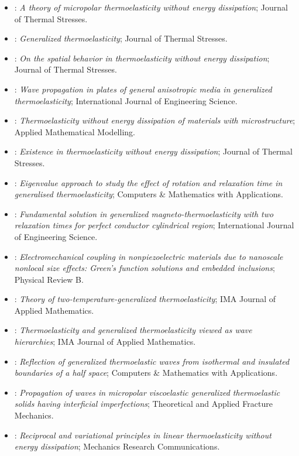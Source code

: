 \begin{itemize}
\item \citet{Ciarletta1999}: \emph{A theory of micropolar thermoelasticity without energy dissipation}; Journal of Thermal Stresses.
\item \citet{HetnarskiIgnaczak1999}: \emph{Generalized thermoelasticity}; Journal of Thermal Stresses.
\item \citet{Quintanilla1999}: \emph{On the spatial behavior in thermoelasticity without energy dissipation}; Journal of Thermal Stresses.
\item \citet{Verma2001}: \emph{Wave propagation in plates of general anisotropic media in generalized thermoelasticity}; International Journal of Engineering Science.
\item \citet{Quintanilla2002}: \emph{Thermoelasticity without energy dissipation of materials with microstructure}; Applied Mathematical Modelling.
\item \citet{Quintanilla2002a}: \emph{Existence in thermoelasticity without energy dissipation}; Journal of Thermal Stresses.
\item \citet{Sinha2003}: \emph{Eigenvalue approach to study the effect of rotation and relaxation time in generalised thermoelasticity}; Computers \& Mathematics with Applications.
\item \citet{Ezzat2004}: \emph{Fundamental solution in generalized magneto-thermoelasticity with two relaxation times for perfect conductor cylindrical region}; International Journal of Engineering Science.
\item \citet{Maranganti2006}: \emph{Electromechanical coupling in nonpiezoelectric materials due to nanoscale nonlocal size effects: Green's function solutions and embedded inclusions}; Physical Review B.
\item \citet{Youssef2006}: \emph{Theory of two-temperature-generalized thermoelasticity}; IMA Journal of Applied Mathematics.
\item \citet{Scott2007}: \emph{Thermoelasticity and generalized thermoelasticity viewed as wave hierarchies}; IMA Journal of Applied Mathematics.
\item \citet{Das2008}: \emph{Reflection of generalized thermoelastic waves from isothermal and insulated boundaries of a half space}; Computers \& Mathematics with Applications.
\item \citet{Kumar2008}: \emph{Propagation of waves in micropolar viscoelastic generalized thermoelastic solids having interficial imperfections}; Theoretical and Applied Fracture Mechanics.
\item \citet{Chirita2010}: \emph{Reciprocal and variational principles in linear thermoelasticity without energy dissipation}; Mechanics Research Communications.

\end{itemize}
